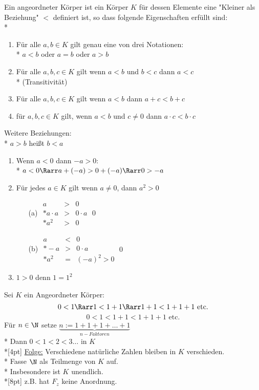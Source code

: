     Ein angeordneter Körper ist ein Körper $K$ für dessen Elemente eine "Kleiner als Beziehung" $<$ definiert ist, so dass folgende Eigenschaften erfüllt sind:\\*
    \begin{enumerate}
    \item{Für alle $a, b \in K$ gilt genau eine von drei Notationen:\\*
    $a < b$ oder $a = b$ oder $a > b$}
    \item{Für alle $a, b, c \in K$ gilt wenn $a < b$ und $b < c$ dann $a < c$\\* (Transitivität)}
    \item{Für alle $a, b, c \in K$ gilt wenn $a < b$ dann $a + c < b + c$}
    \item{für $a, b, c \in K$ gilt, wenn $a < b$ und $c \neq 0$ dann $a \cdot c < b \cdot c$}
    \end{enumerate}
	Weitere Beziehungen:\\*
	$a > b$ heißt $b < a$
	\begin{enumerate}
	\item{Wenn $a < 0$ dann $-a > 0$:\\*
	$a < 0 \Rarr a + (-a) > 0 + (-a) \Rarr 0 > -a$}
	\item{Für jedes $a \in K $ gilt wenn $a \neq 0$, dann $a^2 > 0$
	\begin{itemize}
	\item[(a)]{$\begin{array}{ccc}
	a &>& 0\\*
	a · a &>& 0 · a\\*
	a^2 &>& 0
	\end{array}$\qed}
	\item[(b)]{$\begin{array}{ccc}
		a &<& 0\\*
		-a &>& 0 · a\\*
		a^2 &=& (-a)^2 > 0
		\end{array}$\qed}
	\end{itemize}}
	\item{$1 > 0 $ denn $1 = 1^2$}
	\end{enumerate}
	Sei $K$ ein Angeordneter Körper:
	$$0 < 1 \Rarr 1 < 1 + 1 \Rarr 1 + 1 < 1 + 1 + 1 \text{ etc.}$$
	$$0 < 1 < 1 + 1 < 1 + 1 +1 \text{ etc.}$$
	Für $n \in \N$ setze $\underbrace{n:= 1 + 1 + 1 + … + 1}_{n-Faktoren}$\\*
	Dann $0 < 1 < 2 < 3 … $ in $K$\\*[4pt]
	\ul{Folge:} Verschiedene natürliche Zahlen bleiben in $K$ verschieden.\\*
	Fasse $\N$ als Teilmenge von $K$ auf.\\*
	Insbesondere ist $K$ unendlich.\\*[8pt]
	z.B. hat $F_z$ keine Anordnung.

